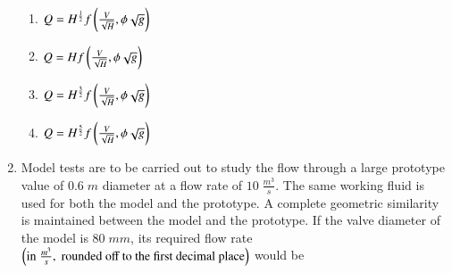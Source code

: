 \documentclass[journal,12pt,onecolumn]{IEEEtran}
\theoremstyle{remark}
\begin{document}
\begin{enumerate}[start=27]
\begin{enumerate}
    \item $Q=H^\frac{1}{2}f\left(\frac{V}{\sqrt{H}},\phi\sqrt{g}\right)$
    \item $Q=H f\left(\frac{V}{\sqrt{H}},\phi\sqrt{g}\right)$
    \item $Q=H^\frac{3}{2}f\left(\frac{V}{\sqrt{H}},\phi\sqrt{g}\right)$
    \item $Q=H^\frac{5}{2}f\left(\frac{V}{\sqrt{H}},\phi\sqrt{g}\right)$
\end{enumerate}
\item Model tests are to be carried out to study the flow through a large prototype value of $0.6\;m$ diameter at a flow rate of $10\;\frac{m^3}{s}$. The same working fluid is used for both the model and the prototype. A complete geometric similarity is maintained between the model and the prototype. If the valve diameter of the model is $80\;mm$, its required flow rate $\left(\text{in}\;\frac{m^3}{s},\;\text{rounded off to the first decimal place}\right)$ would be \underline{\hspace{2cm}} 
\end{enumerate}
\end{document}
